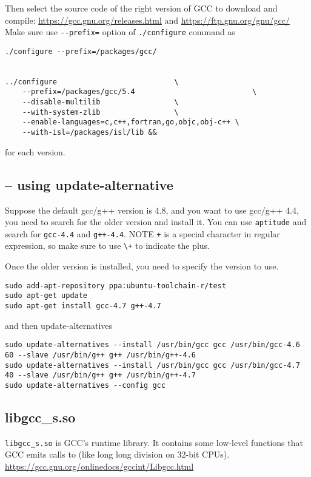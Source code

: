 Then select the source code of the right version of GCC to download and compile:
\url{https://gcc.gnu.org/releases.html}
and \url{https://ftp.gnu.org/gnu/gcc/}
Make sure use \verb!--prefix=! option of \verb!./configure! command as
\begin{verbatim}
./configure --prefix=/packages/gcc/


../configure                           \
    --prefix=/packages/gcc/5.4                           \
    --disable-multilib                 \
    --with-system-zlib                 \
    --enable-languages=c,c++,fortran,go,objc,obj-c++ \
    --with-isl=/packages/isl/lib &&
\end{verbatim}
for each version.

\subsection{-- using update-alternative}
\label{sec:update-alternative}

Suppose the default gcc/g++ version is 4.8, and you want to use gcc/g++ 4.4,
you need to search for the older version and install it.
You can use \verb!aptitude! and search for 
\verb!gcc-4.4! and \verb!g++-4.4!.
NOTE \verb!+! is a special character in regular expression, so make sure to use
\verb!\+! to indicate the plus.

Once the older version is installed, you need to specify the version to use.

\begin{verbatim}
sudo add-apt-repository ppa:ubuntu-toolchain-r/test
sudo apt-get update
sudo apt-get install gcc-4.7 g++-4.7
\end{verbatim}
and then update-alternatives
\begin{verbatim}
sudo update-alternatives --install /usr/bin/gcc gcc /usr/bin/gcc-4.6 60 --slave /usr/bin/g++ g++ /usr/bin/g++-4.6 
sudo update-alternatives --install /usr/bin/gcc gcc /usr/bin/gcc-4.7 40 --slave /usr/bin/g++ g++ /usr/bin/g++-4.7 
sudo update-alternatives --config gcc
\end{verbatim}



\subsection{libgcc\_s.so}
\label{sec:libgcc_s.so}

\verb!libgcc_s.so! is GCC's runtime library. It contains some low-level
functions that GCC emits calls to (like long long division on 32-bit CPUs).
\url{https://gcc.gnu.org/onlinedocs/gccint/Libgcc.html}

